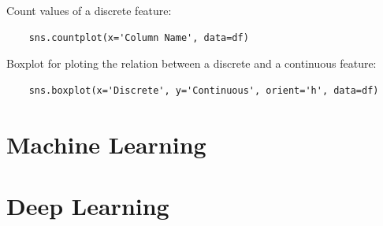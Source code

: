 \documentclass[12pt]{report}
\begin{document}
        Count values of a discrete feature:
        \begin{verbatim}
    sns.countplot(x='Column Name', data=df)
        \end{verbatim}
        
        Boxplot for ploting the relation between a discrete and a continuous feature:
        \begin{verbatim}
    sns.boxplot(x='Discrete', y='Continuous', orient='h', data=df)
        \end{verbatim}
\chapter{Machine Learning}
\chapter{Deep Learning}
    
        
\end{document}
